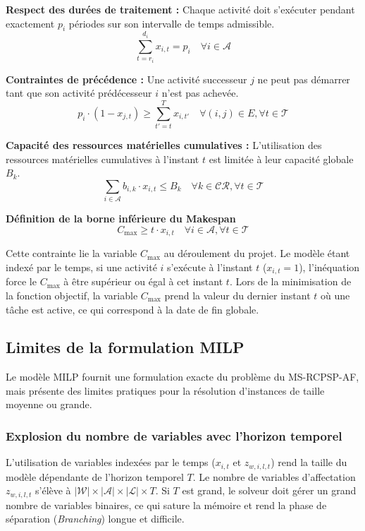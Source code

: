 \noindent \textbf{Respect des durées de traitement :} Chaque activité doit s'exécuter pendant exactement $p_i$ périodes sur son intervalle de temps admissible.
\begin{equation}
    \sum_{t=r_i}^{d_i} x_{i,t} = p_i \quad \forall i \in \mathcal{A} \label{ilp_duration}
\end{equation}

\noindent \textbf{Contraintes de précédence :} Une activité successeur $j$ ne peut pas démarrer tant que son activité prédécesseur $i$ n'est pas achevée.
\begin{equation}
    p_i \cdot (1 - x_{j,t}) \geq \sum_{t'=t}^T x_{i,t'} \quad \forall (i,j) \in E, \forall t \in \mathcal{T} \label{ilp_prec}
\end{equation}

\noindent \textbf{Capacité des ressources matérielles cumulatives :} L'utilisation des ressources matérielles cumulatives à l'instant $t$ est limitée à leur capacité globale $B_k$.
\begin{equation}
    \sum_{i \in \mathcal{A}} b_{i,k} \cdot x_{i,t} \leq B_k \quad \forall k \in \mathcal{CR}, \forall t \in \mathcal{T} \label{ilp_material}
\end{equation}

\noindent \textbf{Définition de la borne inférieure du Makespan}
\begin{equation}
    C_{\max} \geq t \cdot x_{i,t} \quad \forall i \in \mathcal{A}, \forall t \in \mathcal{T}
\end{equation}

\noindent Cette contrainte lie la variable $C_{\max}$ au déroulement du projet. Le modèle étant indexé par le temps, si une activité $i$ s'exécute à l'instant $t$ ($x_{i,t} = 1$), l'inéquation force le $C_{\max}$ à être supérieur ou égal à cet instant $t$. Lors de la minimisation de la fonction objectif, la variable $C_{\max}$ prend la valeur du dernier instant $t$ où une tâche est active, ce qui correspond à la date de fin globale.

\subsection{Limites de la formulation MILP}
Le modèle MILP fournit une formulation exacte du problème du MS-RCPSP-AF, mais présente des limites pratiques pour la résolution d'instances de taille moyenne ou grande.

\subsubsection{Explosion du nombre de variables avec l'horizon temporel}
L'utilisation de variables indexées par le temps ($x_{i,t}$ et $z_{w,i,l,t}$) rend la taille du modèle dépendante de l'horizon temporel $T$. Le nombre de variables d'affectation $z_{w,i,l,t}$ s'élève à $|\mathcal{W}| \times |\mathcal{A}| \times |\mathcal{L}| \times T$. Si $T$ est grand, le solveur doit gérer un grand nombre de variables binaires, ce qui sature la mémoire et rend la phase de séparation (\textit{Branching}) longue et difficile.

